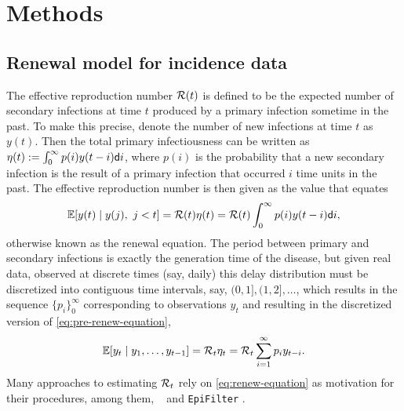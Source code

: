 \section{Methods}

\subsection{Renewal model for incidence data} 

The effective reproduction number $\mathcal{R}(t)$ is defined to be the expected
number of secondary infections at time $t$ produced by a primary infection
sometime in the past. To make this precise, denote the number of new infections
at time $t$ as $y(t)$. Then the total primary infectiousness can be written as
$\eta(t) := \int_0^{\infty} p(i) y(t-i) \mathsf{d} i$, where $p(i)$ is the
probability that a new secondary infection is the result of a primary infection
that occurred $i$ time units in the past. The effective reproduction number is then given
as the value that equates
\begin{equation} \label{eq:pre-renew-equation}
  \mathbb{E}[y(t) \mid y(j),\ j<t]=\mathcal{R}(t)\eta(t)=\mathcal{R}(t)\int_0^\infty p(i)y(t-i)\mathsf{d} i,
\end{equation}
otherwise known as the renewal equation. The period between primary and secondary
infections is exactly the generation time of the disease, but given real data,
observed at discrete times (say, daily) this delay distribution must be discretized
into contiguous time intervals,
say, $(0,1], (1,2], \dots$, which results in the sequence $\{p_i\}_0^\infty$
corresponding to observations $y_t$ and resulting in the
discretized version of \eqref{eq:pre-renew-equation},
\begin{equation} \label{eq:renew-equation}
  \mathbb{E}[y_t \mid y_1,\ldots,y_{t-1}]=\mathcal{R}_t\eta_t=\mathcal{R}_t\sum_{i = 1}^\infty p_i y_{t-i}.
\end{equation}
Many approaches to estimating $\mathcal{R}_t$ rely on \eqref{eq:renew-equation} as
motivation for their procedures, among them, \EpiEstim\ \citep{cori2013new} 
and \texttt{EpiFilter} \citep{parag2021improved}. 


